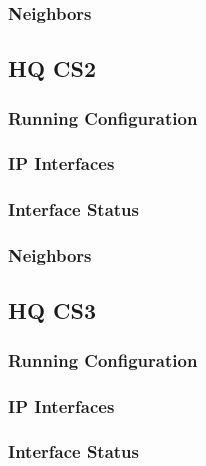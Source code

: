 \subsubsection{Neighbors}


\subsection{HQ CS2}
\subsubsection{Running Configuration}


\subsubsection{IP Interfaces}


\subsubsection{Interface Status}


\subsubsection{Neighbors}


\subsection{HQ CS3}
\subsubsection{Running Configuration}


\subsubsection{IP Interfaces}


\subsubsection{Interface Status}


